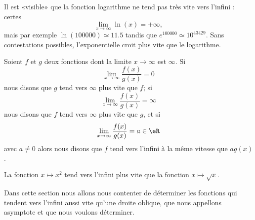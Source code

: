 Il est «visible» que la fonction logarithme ne tend pas très vite vers l'infini : certes
\begin{equation}
    \lim_{x\to \infty} \ln(x)=+\infty,
\end{equation}
mais par exemple \( \ln(100000)\simeq 11.5\) tandis que \(  e^{100000}\simeq 10^{43429}\). Sans contestations possibles, l'exponentielle croit plus vite que le logarithme.

Soient \( f\) et \( g\) deux fonctions dont la limite \( x\to \infty\) est \( \infty\). Si
\begin{equation}
    \lim_{x\to \infty} \frac{ f(x) }{ g(x) }=0
\end{equation}
nous disons que \( g\) tend vers \( \infty\) plus vite que \( f\); si
\begin{equation}
    \lim_{x\to \infty} \frac{ f(x) }{ g(x) }=\infty
\end{equation}
nous disons que \( f\) tend vers \( \infty\) plus vite que \( g\), et si
\begin{equation}
    \lim_{x\to \infty} \frac{ f(x) }{ g(x) }=a\in \eR
\end{equation}
avec \( a\neq 0\) alors nous disons que \( f\) tend vers l'infini à la même vitesse que \( ag(x)\).

\begin{example}
    La fonction \( x\mapsto x^2\) tend vers l'infini plus vite que la fonction \( x\mapsto \sqrt{x}\).
\end{example}

Dans cette section nous allons nous contenter de déterminer les fonctions qui tendent vers l'infini aussi vite qu'une droite oblique, que nous appellons asymptote et que nous voulons déterminer.


